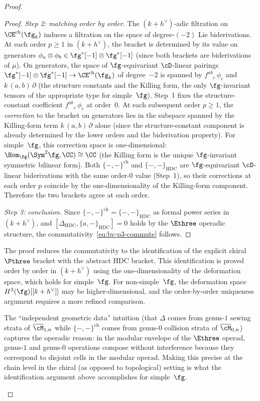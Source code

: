 \begin{proof}
\begin{proof}
\textit{Step 2: matching order by order.}
The $(k+h^\vee)$-adic filtration on
$\CE^{\mathrm{ch}}(\fg_k)$ induces a filtration on the
space of degree-$(-2)$ Lie biderivations. At each order
$p \geq 1$ in $(k+h^\vee)$, the bracket is determined by
its value on generators
$\phi_a \otimes \phi_b \in \fg^*[-1] \otimes \fg^*[-1]$
(since both brackets are biderivations of $\mu$). On
generators, the space of $\fg$-equivariant $\cD$-linear
pairings $\fg^*[-1] \otimes \fg^*[-1] \to
\CE^{\mathrm{ch}}(\fg_k)$ of degree~$-2$ is spanned by
$f^{ab}{}_c\,\phi_c$ and $k\,(a,b)\,\partial$ (the
structure constants and the Killing form, the only
$\fg$-invariant tensors of the appropriate type for
simple~$\fg$). Step~1 fixes the structure-constant coefficient
$f^{ab}{}_c\,\phi_c$ at order~$0$.  At each subsequent
order $p \geq 1$, the \emph{correction} to the bracket on
generators lies in the subspace spanned by the Killing-form
term $k\,(a,b)\,\partial$ alone (since the
structure-constant component is already determined by
the lower orders and the biderivation property).
For simple~$\fg$, this correction space is
one-dimensional: $\Hom_\fg(\Sym^2\fg, \CC) \cong \CC$
(the Killing form is the unique $\fg$-invariant symmetric
bilinear form).  Both $\{-,-\}^{\mathrm{ch}}$ and
$\{-,-\}_{\mathrm{HDC}}$ are $\fg$-equivariant
$\cD$-linear biderivations with the same
order-$0$ value (Step~1), so their corrections at each
order $p$ coincide by the one-dimensionality of the
Killing-form component.  Therefore the two brackets agree
at each order.

\textit{Step 3: conclusion.}
Since $\{-,-\}^{\mathrm{ch}} = \{-,-\}_{\mathrm{HDC}}$
as formal power series in $(k+h^\vee)$, and
$[\Delta_{\mathrm{HDC}}, \{a,-\}_{\mathrm{HDC}}] = 0$
holds by the $\Ethree$ operadic structure,
the commutativity~\eqref{eq:bv-p3-commute} follows.
\end{proof}

\begin{remark}
\label{rem:bv-p3-chain-level}
The proof reduces the commutativity to the identification
of the explicit chiral $\Pthree$ bracket with the abstract
HDC bracket. This identification is proved order by order
in $(k+h^\vee)$ using the one-dimensionality of the
deformation space, which holds for simple~$\fg$.
For non-simple~$\fg$, the deformation space
$H^3(\fg)[[k+h^\vee]]$ may be higher-dimensional, and the
order-by-order uniqueness argument requires a more refined
comparison.

The ``independent geometric data'' intuition (that
$\Delta$ comes from genus-$1$ sewing strata of
$\overline{\cM}_{1,n}$ while
$\{-,-\}^{\mathrm{ch}}$ comes from genus-$0$ collision
strata of $\overline{\cM}_{0,n}$) captures the operadic
reason: in the modular envelope of the $\Ethree$ operad,
genus-$1$ and genus-$0$ operations compose without
interference because they correspond to disjoint cells
in the modular operad. Making this precise at the
chain level in the chiral (as opposed to topological)
setting is what the identification argument above
accomplishes for simple~$\fg$.
\end{remark}


\end{proof}
